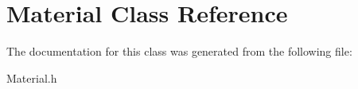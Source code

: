 \hypertarget{class_material}{}\section{Material Class Reference}
\label{class_material}


The documentation for this class was generated from the following file\+:\begin{DoxyCompactItemize}
\item 
Material.\+h\end{DoxyCompactItemize}
